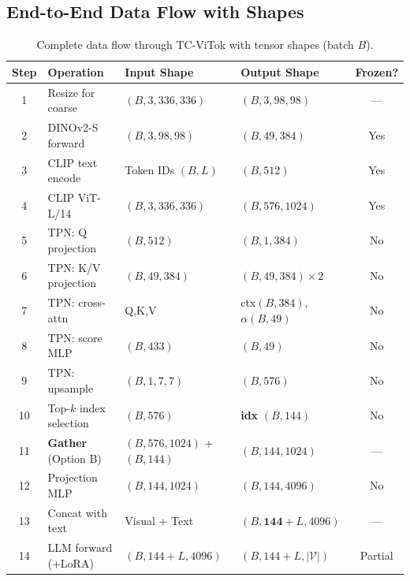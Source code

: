 \documentclass[11pt,a4paper]{article}
\begin{document}
\subsection{End-to-End Data Flow with Shapes}

\begin{table}[h]
\centering
\caption{Complete data flow through TC-ViTok with tensor shapes (batch $B$).}
\label{tab:data_flow}
\renewcommand{\arraystretch}{1.15}
\small
\begin{tabular}{@{}clllc@{}}
  \toprule
  Step & Operation & Input Shape & Output Shape & Frozen? \\
  \midrule
  1  & Resize for coarse        & $(B,3,336,336)$     & $(B,3,98,98)$       & --- \\
  2  & DINOv2-S forward         & $(B,3,98,98)$       & $(B,49,384)$        & Yes \\
  3  & CLIP text encode         & Token IDs $(B,L)$   & $(B,512)$           & Yes \\
  4  & CLIP ViT-L/14            & $(B,3,336,336)$     & $(B,576,1024)$      & Yes \\
  5  & TPN: Q projection        & $(B,512)$           & $(B,1,384)$         & No  \\
  6  & TPN: K/V projection      & $(B,49,384)$        & $(B,49,384)\times2$ & No  \\
  7  & TPN: cross-attn          & Q,K,V               & ctx$(B,384)$, $\alpha(B,49)$ & No \\
  8  & TPN: score MLP           & $(B,433)$           & $(B,49)$            & No  \\
  9  & TPN: upsample            & $(B,1,7,7)$         & $(B,576)$           & No  \\
  10 & Top-$k$ index selection  & $(B,576)$           & \textbf{idx} $(B,144)$   & No  \\
  11 & \textbf{Gather} (Option B) & $(B,576,1024)$ + $(B,144)$ & \boldmath$(B,144,1024)$ & --- \\
  12 & Projection MLP           & $(B,144,1024)$      & $(B,144,4096)$      & No  \\
  13 & Concat with text         & Visual + Text       & $(B,\mathbf{144}{+}L,4096)$ & --- \\
  14 & LLM forward (+LoRA)      & $(B,144{+}L,4096)$  & $(B,144{+}L,|\mathcal{V}|)$ & Partial \\
  \bottomrule
\end{tabular}
\end{table}
\end{document}
